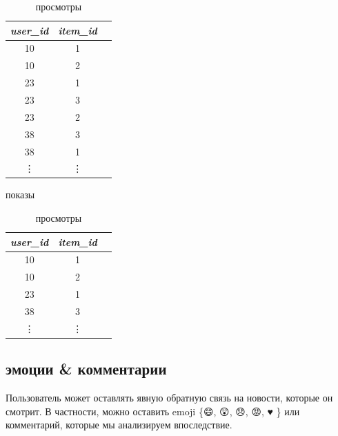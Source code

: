 \documentclass[14pt]{matmex-diploma-custom}
\begin{document}
\begin{table}[h]
    \parbox{.45\textwidth}{
        \centering
        \begin{tabular}{ccc}
            \toprule

            \emph{user\_id} & \emph{item\_id} \\\midrule
            10 & 1  \\
            10 & 2  \\
            23 & 1  \\
            23 & 3  \\
            23 & 2  \\
            38 & 3  \\
            38 & 1  \\
            \vdots & \vdots  \\\bottomrule
        \end{tabular}
        \caption{показы}
        \label{tab:show}
    }
    \hfill
    \parbox{.45\textwidth}{
        \centering
        \begin{tabular}{ccc}
            \toprule

            \emph{user\_id} & \emph{item\_id} \\\midrule
            10 & 1  \\
            10 & 2  \\
            23 & 1  \\
            38 & 3  \\
            \vdots & \vdots  \\\bottomrule
        \end{tabular}
        \caption{просмотры}
        \label{tab:view}
        }
\end{table}   





\subsection*{эмоции \& комментарии}

Пользователь может оставлять явную обратную связь на новости, которые он смотрит. В частности, можно оставить emoji \{{\DejaSans 😄, 😲, 😞, 😡, ♥ }\} или комментарий, которые мы анализируем впоследствие.
\end{document}
